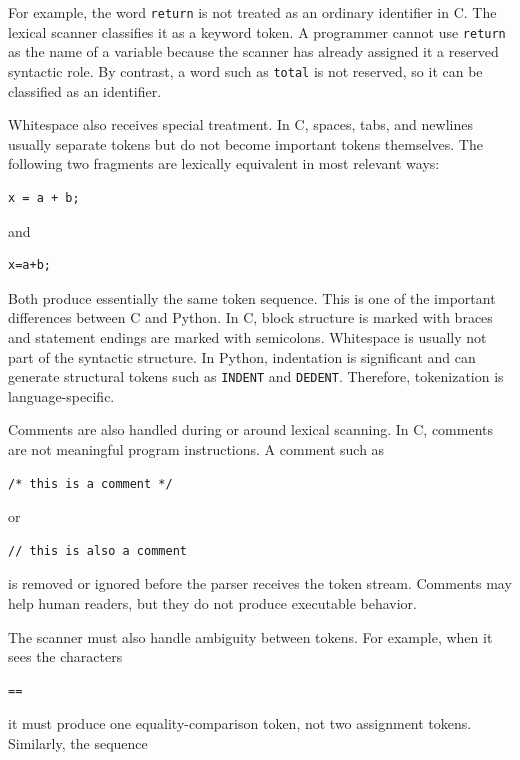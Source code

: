 For example, the word \texttt{return} is not treated as an ordinary identifier in C. The lexical scanner classifies it as a keyword token. A programmer cannot use \texttt{return} as the name of a variable because the scanner has already assigned it a reserved syntactic role. By contrast, a word such as \texttt{total} is not reserved, so it can be classified as an identifier.

Whitespace also receives special treatment. In C, spaces, tabs, and newlines usually separate tokens but do not become important tokens themselves. The following two fragments are lexically equivalent in most relevant ways:

\begin{verbatim}
x = a + b;
\end{verbatim}

and

\begin{verbatim}
x=a+b;
\end{verbatim}

Both produce essentially the same token sequence. This is one of the important differences between C and Python. In C, block structure is marked with braces and statement endings are marked with semicolons. Whitespace is usually not part of the syntactic structure. In Python, indentation is significant and can generate structural tokens such as \texttt{INDENT} and \texttt{DEDENT}. Therefore, tokenization is language-specific.

Comments are also handled during or around lexical scanning. In C, comments are not meaningful program instructions. A comment such as

\begin{verbatim}
/* this is a comment */
\end{verbatim}

or

\begin{verbatim}
// this is also a comment
\end{verbatim}

is removed or ignored before the parser receives the token stream. Comments may help human readers, but they do not produce executable behavior.

The scanner must also handle ambiguity between tokens. For example, when it sees the characters

\begin{verbatim}
==
\end{verbatim}

it must produce one equality-comparison token, not two assignment tokens. Similarly, the sequence

